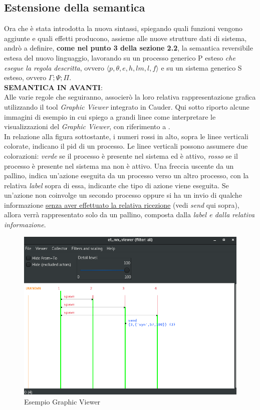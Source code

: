 \documentclass[Contributo.tex]{subfiles}
\begin{document}
\subsection{Estensione della semantica}
Ora che è stata introdotta la nuova sintassi, spiegando quali funzioni vengono aggiunte e quali effetti producono, assieme alle nuove strutture dati di sistema, andrò a definire, \textbf{come nel punto 3 della sezione 2.2}, la semantica reversibile estesa del nuovo linguaggio, lavorando su un processo generico P esteso \textit{che esegue la regola descritta}, ovvero $\displaystyle \langle p,\theta,e,h,lm,l,f \rangle$ e su un sistema generico S esteso, ovvero $\displaystyle \Gamma;\Psi;\Pi$.\\
\textbf{SEMANTICA IN AVANTI}:\\
	Alle varie regole che seguiranno, associerò la loro relativa rappresentazione grafica utilizzando il tool \textit{Graphic Viewer} integrato in Cauder. Qui sotto riporto alcune immagini di esempio in cui spiego a grandi linee come interpretare le visualizzazioni del \textit{Graphic Viewer}, con riferimento a \cite{et}.\\
	In relazione alla figura sottostante, i numeri rossi in alto, sopra le linee verticali colorate, indicano il pid di un processo. Le linee verticali possono assumere due colorazioni: \textit{verde} se il processo è presente nel sistema ed è attivo, \textit{rosso} se il processo è presente nel sistema ma non è attivo. Una freccia uscente da un pallino, indica un'azione eseguita da un processo verso un altro processo, con la relativa \textit{label} sopra di essa, indicante che tipo di azione viene eseguita. Se un'azione non coinvolge un secondo processo oppure si ha un invio di qualche informazione \underline{senza aver effettuato la relativa ricezione} (vedi \textit{send} qui sopra), allora verrà rappresentato solo da un pallino, composta dalla \textit{label e dalla relativa informazione}.
	\begin{figure}[H]
		\includegraphics[scale=0.5]{./LavoroLuca/EstensioneCauder/Imgs/GraphicViewerSend}
		\caption{Esempio Graphic Viewer}
		\label{fig5}
	\end{figure}
\end{document}
